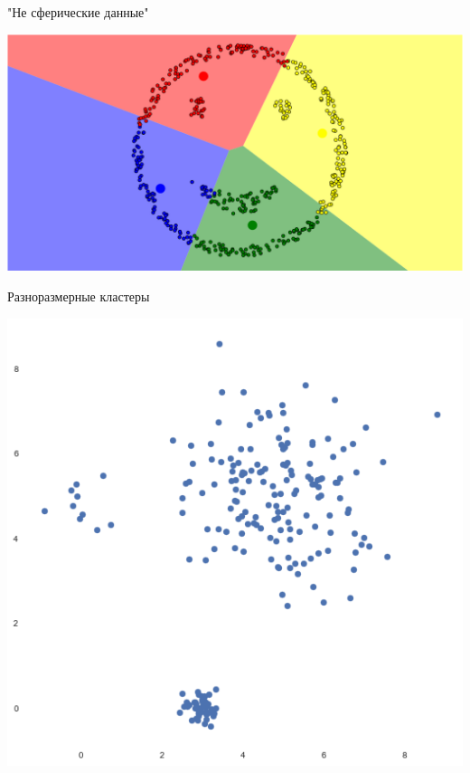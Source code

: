 \documentclass[10pt]{beamer}
\begin{document}
\begin{frame}{"Не сферические данные"}
	\begin{center}
	  \includegraphics[width=\textwidth, keepaspectratio = true]{images/non_spherical-3}  
	\end{center}
\end{frame}	

\begin{frame}{Разноразмерные кластеры}
	\begin{center}
	  \includegraphics[width=\textwidth, height=0.8 \textheight, keepaspectratio = true]{images/different_sizes-1}  
	\end{center}
\end{frame}
\end{document}
